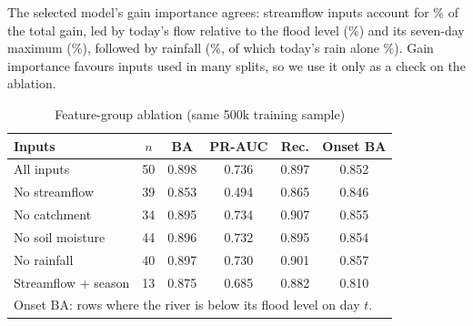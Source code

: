 \documentclass[conference]{IEEEtran}
\begin{document}
The selected model's gain importance agrees: streamflow inputs account for \ImpFlow\% of the total gain, led by today's flow relative to the flood level (\ImpTopOne\%) and its seven-day maximum (\ImpTopTwo\%), followed by rainfall (\ImpRain\%, of which today's rain alone \ImpRainDay\%). Gain importance favours inputs used in many splits, so we use it only as a check on the ablation.


\begin{table}[t]
\caption{Feature-group ablation (same 500k training sample)}
\label{tab:abl}
\centering
\footnotesize
\setlength{\tabcolsep}{3pt}
\begin{tabular}{lccccc}
\toprule
Inputs & $n$ & BA & PR-AUC & Rec. & Onset BA\\
\midrule
All inputs & 50 & 0.898 & 0.736 & 0.897 & 0.852\\
No streamflow & 39 & 0.853 & 0.494 & 0.865 & 0.846\\
No catchment & 34 & 0.895 & 0.734 & 0.907 & 0.855\\
No soil moisture & 44 & 0.896 & 0.732 & 0.895 & 0.854\\
No rainfall & 40 & 0.897 & 0.730 & 0.901 & 0.857\\
Streamflow + season & 13 & 0.875 & 0.685 & 0.882 & 0.810\\
\bottomrule
\multicolumn{6}{l}{\scriptsize Onset BA: rows where the river is below its flood level on day $t$.}\\
\end{tabular}
\end{table}
\end{document}
